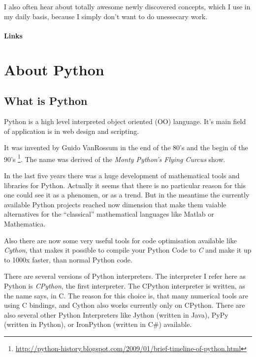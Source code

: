 \documentclass[letterpaper,10pt,english]{manual}
\begin{document}
I also often hear about totally awesome newly discovered concepts, which I use in my daily basis,
because I simply don't want to do unessecary work.
\paragraph{Links}

\resetcurrentobjects
\hypertarget{--doc-Python}{}

\section{About Python}


\subsection{What is Python}

Python is a high level interpreted object oriented (OO) language.
It's main field of application is in web design and scripting.

It was invented by Guido VanRossum in the end of the 80's and the begin of
the 90's \footnote{
\href{http://python-history.blogspot.com/2009/01/brief-timeline-of-python.html}{http://python-history.blogspot.com/2009/01/brief-timeline-of-python.html}
}. The name was derived of the \emph{Monty Python's Flying Curcus}
show.

In the last five years there was a huge development of mathematical tools
and libraries for Python. Actually it seems that there is no particular reason for
this one could see it as a phenomen, or as a trend. But in the meantime the currently
available Python projects reached now dimension that make them vaiable alternatives
for the ``classical'' mathematical languages like Matlab or Mathematica.

Also there are now some very useful tools for code optimisation available like \emph{Cython},
that makes it possible to compile your Python Code to \emph{C} and make it up to 1000x faster,
than normal Python code.

There are several versions of Python interpreters. The interpreter I
refer here as Python is \emph{CPython}, the first interpreter. The CPython interpreter is written,
as the name says, in C. The reason for this choice is, that many
numerical tools are using C bindings, and Cython also works currently
only on CPython. There are also several other
Python Interpreters like Jython (written in Java), PyPy (written in
Python), or IronPython (written in C\#) available.
\end{document}
